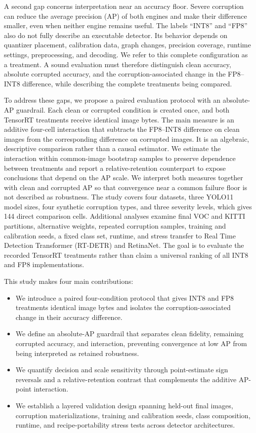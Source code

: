 \documentclass[a4paper,fleqn]{cas-dc}
\begin{document}
A second gap concerns interpretation near an accuracy floor. Severe corruption can reduce the average precision (AP) of both engines and make their difference smaller, even when neither engine remains useful. The labels ``INT8'' and ``FP8'' also do not fully describe an executable detector. Its behavior depends on quantizer placement, calibration data, graph changes, precision coverage, runtime settings, preprocessing, and decoding. We refer to this complete configuration as a treatment. A sound evaluation must therefore distinguish clean accuracy, absolute corrupted accuracy, and the corruption-associated change in the FP8--INT8 difference, while describing the complete treatments being compared.

To address these gaps, we propose a paired evaluation protocol with an absolute-AP guardrail. Each clean or corrupted condition is created once, and both TensorRT treatments receive identical image bytes. The main measure is an additive four-cell interaction that subtracts the FP8--INT8 difference on clean images from the corresponding difference on corrupted images. It is an algebraic, descriptive comparison rather than a causal estimator. We estimate the interaction within common-image bootstrap samples to preserve dependence between treatments and report a relative-retention counterpart to expose conclusions that depend on the AP scale. We interpret both measures together with clean and corrupted AP so that convergence near a common failure floor is not described as robustness. The study covers four datasets, three YOLO11 model sizes, four synthetic corruption types, and three severity levels, which gives 144 direct comparison cells. Additional analyses examine final VOC and KITTI partitions, alternative weights, repeated corruption samples, training and calibration seeds, a fixed class set, runtime, and stress transfer to Real Time Detection Transformer (RT-DETR) and RetinaNet. The goal is to evaluate the recorded TensorRT treatments rather than claim a universal ranking of all INT8 and FP8 implementations.

This study makes four main contributions:
\begin{itemize}[leftmargin=1.45em,itemsep=2pt,topsep=3pt,parsep=0pt]
  \item We introduce a paired four-condition protocol that gives INT8 and FP8 treatments identical image bytes and isolates the corruption-associated change in their accuracy difference.
  \item We define an absolute-AP guardrail that separates clean fidelity, remaining corrupted accuracy, and interaction, preventing convergence at low AP from being interpreted as retained robustness.
  \item We quantify decision and scale sensitivity through point-estimate sign reversals and a relative-retention contrast that complements the additive AP-point interaction.
  \item We establish a layered validation design spanning held-out final images, corruption materializations, training and calibration seeds, class composition, runtime, and recipe-portability stress tests across detector architectures.
\end{itemize}
\end{document}
